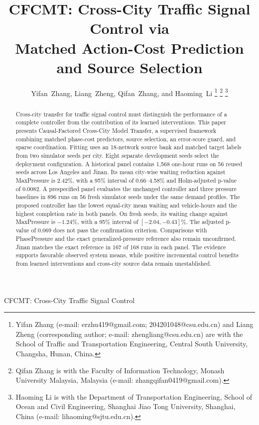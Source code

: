 \documentclass[letterpaper,journal]{IEEEtran}
\begin{document}
\title{CFCMT: Cross-City Traffic Signal Control via\\Matched Action-Cost Prediction and Source Selection}
\author{Yifan~Zhang, Liang~Zheng, Qifan~Zhang, and Haoming~Li%
\thanks{Yifan Zhang (e-mail: erzhu419@gmail.com; 204201048@csu.edu.cn) and Liang Zheng (corresponding author; e-mail: zhengliang@csu.edu.cn) are with the School of Traffic and Transportation Engineering, Central South University, Changsha, Hunan, China.}%
\thanks{Qifan Zhang is with the Faculty of Information Technology, Monash University Malaysia, Malaysia (e-mail: zhangqifan0419@gmail.com).}%
\thanks{Haoming Li is with the Department of Transportation Engineering, School of Ocean and Civil Engineering, Shanghai Jiao Tong University, Shanghai, China (e-mail: lihaoming@sjtu.edu.cn).}}
%
{CFCMT: Cross-City Traffic Signal Control}
\maketitle

\begin{abstract}
Cross-city transfer for traffic signal control must distinguish the performance of a complete controller from the contribution of its learned interventions. This paper presents Causal-Factored Cross-City Model Transfer, a supervised framework combining matched phase-cost predictors, source selection, an error-score guard, and sparse coordination. Fitting uses an 18-network source bank and matched target labels from two simulator seeds per city. Eight separate development seeds select the deployment configuration. A historical panel contains 1,568 one-hour runs on 56 reused seeds across Los Angeles and Jinan. Its mean city-wise waiting reduction against MaxPressure is 2.42\%, with a 95\% interval of 0.66--4.58\% and Holm-adjusted p-value of 0.0082. A prespecified panel evaluates the unchanged controller and three pressure baselines in 896 runs on 56 fresh simulator seeds under the same demand profiles. The proposed controller has the lowest equal-city mean waiting and vehicle-hours and the highest completion rate in both panels. On fresh seeds, its waiting change against MaxPressure is $-1.24\%$, with a 95\% interval of $[-2.04,-0.43]\%$. The adjusted p-value of 0.069 does not pass the confirmation criterion. Comparisons with PhasePressure and the exact generalized-pressure reference also remain unconfirmed. Jinan matches the exact reference in 167 of 168 runs in each panel. The evidence supports favorable observed system means, while positive incremental control benefits from learned interventions and cross-city source data remain unestablished.
\end{abstract}
\end{document}
